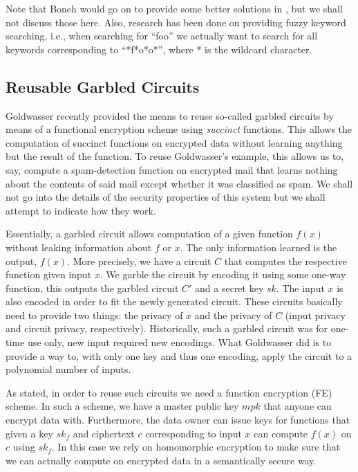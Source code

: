 \documentclass[12pt]{article}
\begin{document}
Note that Boneh would go on to provide some better solutions in \cite{boneh2007public}, but we shall not discuss those here.
Also, research has been done \cite{li2010fuzzy} on providing fuzzy keyword searching, i.e., when searching for ``foo'' we actually want to search for all keywords corresponding to ``*f*o*o*'', where * is the wildcard character.




\subsection{Reusable Garbled Circuits}

Goldwasser \cite{goldwasser2013reusable} recently provided the means to reuse so-called garbled circuits by means of a functional encryption scheme using \emph{succinct} functions.
This allows the computation of succinct functions on encrypted data without learning anything but the result of the function.
To reuse Goldwasser's example, this allows us to, say, compute a spam-detection function on encrypted mail that learns nothing about the contents of said mail except whether it was classified as spam.
We shall not go into the details of the security properties of this system but we shall attempt to indicate how they work.

Essentially, a garbled circuit allows computation of a given function $f(x)$ without leaking information about $f$ or $x$.
The only information learned is the output, $f(x)$.
More precisely, we have a circuit $C$ that computes the respective function given input $x$.
We garble the circuit by encoding it using some one-way function, this outputs the garbled circuit $C'$ and a secret key $sk$.
The input $x$ is also encoded in order to fit the newly generated circuit.
These circuits basically need to provide two things: the privacy of $x$ and the privacy of $C$ (input privacy and circuit privacy, respectively).
Historically, such a garbled circuit was for one-time use only, new input required new encodings.
What Goldwasser did is to provide a way to, with only one key and thus one encoding, apply the circuit to a polynomial number of inputs.

As stated, in order to reuse such circuits we need a function encryption (FE) scheme.
In such a scheme, we have a master public key $mpk$ that anyone can encrypt data with.
Furthermore, the data owner can issue keys for functions that given a key $sk_f$ and ciphertext $c$ corresponding to input $x$ can compute $f(x)$ on $c$ using $sk_f$.
In this case we rely on homomorphic encryption to make sure that we can actually compute on encrypted data in a semantically secure way.
\end{document}
